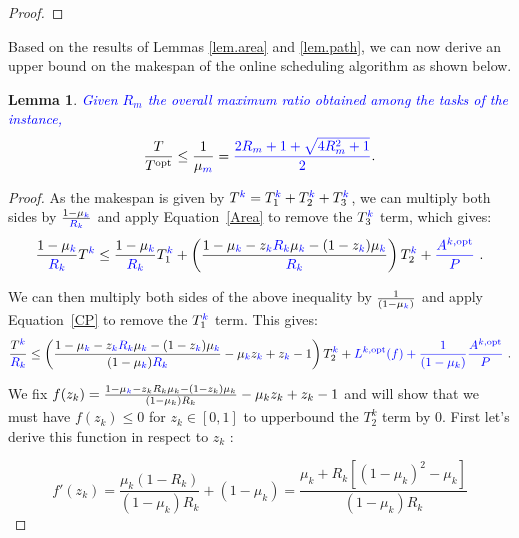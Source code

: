 \documentclass{article}
\newtheorem{lemma}{Lemma}
\newcommand\ratio{R\xspace}
\newcommand\opt{\textnormal{opt}\xspace}
\newcommand{\new}[1]{\textcolor{blue}{#1}}
\newcommand{\LP}[2][inline]{\todo[color=green!50,#1]{\sf \textbf{Lucas:} #2}
\xspace}
\begin{document}
\begin{proof}
\end{proof}

Based on the results of Lemmas \ref{lem.area} and \ref{lem.path}, we can now derive an upper bound on the makespan of the online scheduling algorithm as shown below.

\begin{lemma}\label{lem.makespan}
\new{Given $\ratio_m$ the overall maximum ratio obtained among the tasks of the instance,}
\begin{equation}\label{eq.makespan}
\frac{T}{T^{\opt}} \leq \frac{1}{\mu_{\new{m}}}=\new{ \frac{2\ratio_m+1+\sqrt{4\ratio_m^2+1}}{2}} .
\end{equation}

\end{lemma}


\begin{proof}
As the makespan is given by $T^{\new{k}}=T_1^{\new{k}}+T_2^{\new{k}}+T_3^{\new{k}}$, we can multiply both sides by $\frac{1-\mu_{\new{k}}}{\new{\ratio_k}}$ and apply
Equation~\eqref{Area} to remove the $T_3^{\new{k}}$ term, which gives:
$$\frac{1-\mu_{\new{k}}}{\new{\ratio_k}}T^{\new{k}} \leq \frac{1-\mu_{\new{k}}}{\new{\ratio_k}} T_1^{\new{k}}+\left(\frac{1-\mu_{\new{k}}-z_{\new{k}}\new{\ratio_k} \mu_{\new{k}}-(1-z_{\new{k}})\mu_{\new{k}}}{\new{\ratio_k}} \right)T_2^{\new{k}}+\new{\frac{A^{k,\opt}}{P}} \ . $$

We can then multiply both sides of the above inequality by $\frac{1}{(1-\mu_{\new{k}})}$ and apply Equation~\eqref{CP} to remove the $T_1^{\new{k}}$ term. This gives:
$$\frac{T^{\new{k}}}{\new{\ratio_k}} \leq \left(\frac{1-\mu_{\new{k}}-z_{\new{k}}\new{\ratio_k} \mu_{\new{k}}-(1-z_{\new{k}})\mu_{\new{k}}}{(1-\mu_{\new{k}})\new{\ratio_k}}-\mu_{\new{k}} z_{\new{k}}+z_{\new{k}}-1\right)T_2^{\new{k}}+\new{L^{k,\opt}(f)+\frac{1}{(1-\mu_k)}\frac{A^{k,\opt}}{P}} \ . $$


\LP{New after this}

We fix $f(z_{k})=\frac{1-\mu_{\new{k}}-z_{k}\ratio_k \mu_{k}-(1-z_{k})\mu_{k}}{(1-\mu_{k})\ratio_k}-\mu_{k} z_{k}+z_{k}-1$ and will show that we must have $f(z_{k}) \leq 0$ for $z_k \in [0,1]$ to upperbound the $T_2^k$ term by $0$. First let's derive this function in respect to $z_k$ :

$$ f'(z_k)=\frac{\mu_k(1-\ratio_k)}{(1-\mu_k)\ratio_k}+(1-\mu_k) = \frac{\mu_k + \ratio_k\left[(1-\mu_k)^2-\mu_k \right]}{(1-\mu_k)\ratio_k}$$


\end{proof}
\end{document}
